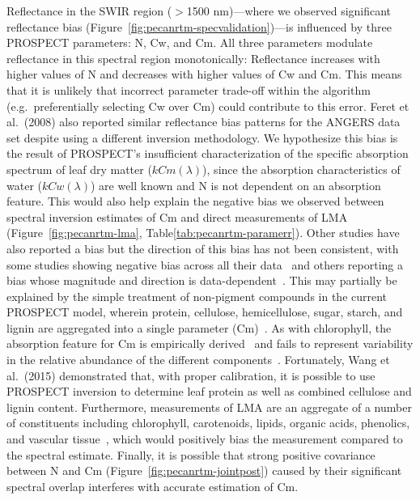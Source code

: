Reflectance in the SWIR region ($>$1500 nm)---where we observed significant reflectance bias (Figure~\ref{fig:pecanrtm-specvalidation})---is influenced by three PROSPECT parameters: N, Cw, and Cm.%
All three parameters modulate reflectance in this spectral region monotonically: 
Reflectance increases with higher values of N and decreases with higher values of Cw and Cm.%
This means that it is unlikely that incorrect parameter trade-off within the algorithm (e.g.\ preferentially selecting Cw over Cm) could contribute to this error.
Feret et al.~(2008) also reported similar reflectance bias patterns for the ANGERS data set despite using a different inversion methodology. \nocite{feret_2008_prospect}
We hypothesize this bias is the result of PROSPECT’s insufficient characterization of the specific absorption spectrum of leaf dry matter ($kCm(\lambda)$),
since the absorption characteristics of water ($kCw(\lambda)$) are well known and N is not dependent on an absorption feature.
This would also help explain the negative bias we observed between spectral inversion estimates of Cm and direct measurements of LMA (Figure~\ref{fig:pecanrtm-lma}, Table\ref{tab:pecanrtm-paramerr}). %
Other studies have also reported a bias but the direction of this bias has not been consistent, with some studies showing negative bias across all their data~\cite{li_2011_retrieval,cheng_2014_deriving} and others reporting a bias whose magnitude and direction is data-dependent~\cite{feret_2008_prospect}.
This may partially be explained by the simple treatment of non-pigment compounds in the current PROSPECT model, wherein protein, cellulose, hemicellulose, sugar, starch, and lignin are aggregated into a single parameter (Cm)~\cite{fourty_1996_leaf}.
As with chlorophyll, the absorption feature for Cm is empirically derived~\cite{feret_2008_prospect} and fails to represent variability in the relative abundance of the different components~\cite{poorter_2009_causes}.
Fortunately, Wang et al.~(2015) demonstrated that, with proper calibration, it is possible to use PROSPECT inversion to determine leaf protein as well as combined cellulose and lignin content. \nocite{wang_2015_applicability}
Furthermore, measurements of LMA are an aggregate of a number of constituents including chlorophyll, carotenoids, lipids, organic acids, phenolics, and vascular tissue~\cite{poorter_2009_causes}, which would positively bias the measurement compared to the spectral estimate.
Finally, it is possible that strong positive covariance between N and Cm (Figure~\ref{fig:pecanrtm-jointpost}) caused by their significant spectral overlap interferes with accurate estimation of Cm. %
